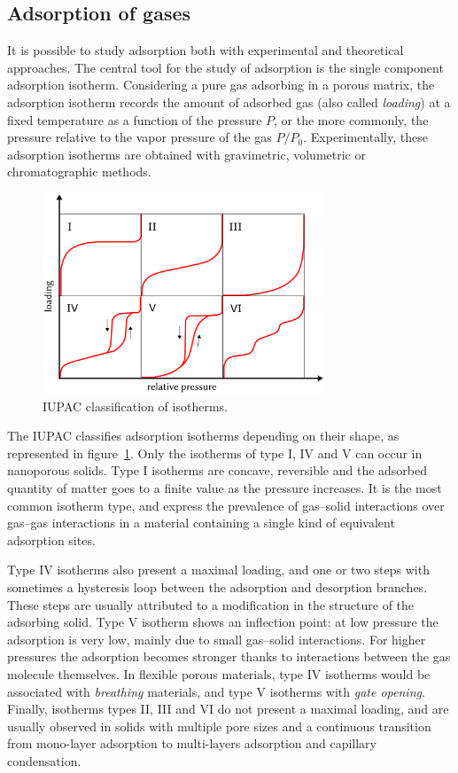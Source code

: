 \documentclass[thesis]{subfiles}
\begin{document}
\subsection{Adsorption of gases}

It is possible to study adsorption both with experimental and theoretical
approaches. The central tool for the study of adsorption is the single component
adsorption isotherm. Considering a pure gas adsorbing in a porous matrix, the
adsorption isotherm records the amount of adsorbed gas (also called
\emph{loading}) at a fixed temperature as a function of the pressure $P$, or the
more commonly, the pressure relative to the vapor pressure of the gas $P/P_0$.
Experimentally, these adsorption isotherms are obtained with gravimetric,
volumetric or chromatographic methods\cite{Ruthven1984, Yang1987}.

\begin{figure}[htb]
    \centering
    \includegraphics[width=0.75\textwidth]{figures/images/iupac-isotherms}
    \caption{IUPAC classification of isotherms.}
    \label{fig:iupac-isotherms}
\end{figure}

The IUPAC classifies adsorption isotherms depending on their shape, as
represented in figure~\ref{fig:iupac-isotherms}\cite{Sing1985}. Only the
isotherms of type I, IV and V can occur in nanoporous solids. Type I isotherms
are concave, reversible and the adsorbed quantity of matter goes to a finite
value as the pressure increases. It is the most common isotherm type, and
express the prevalence of gas--solid interactions over gas--gas interactions in
a material containing a single kind of equivalent adsorption sites.

Type IV isotherms also present a maximal loading, and one or two steps with
sometimes a hysteresis loop between the adsorption and desorption branches.
These steps are usually attributed to a modification in the structure of the
adsorbing solid\cite{Karge1989}. Type V isotherm shows an inflection point: at
low pressure the adsorption is very low, mainly due to small gas--solid
interactions. For higher pressures the adsorption becomes stronger thanks to
interactions between the gas molecule themselves. In flexible porous materials,
type IV isotherms would be associated with \emph{breathing} materials, and type
V isotherms with \emph{gate opening}. Finally, isotherms types II, III and VI do
not present a maximal loading, and are usually observed in solids with multiple
pore sizes and a continuous transition from mono-layer adsorption to
multi-layers adsorption and capillary condensation.
\end{document}
